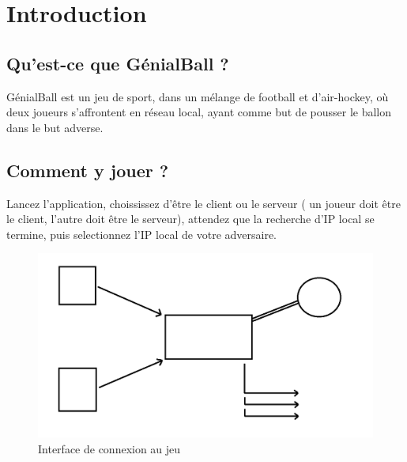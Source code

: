 \chapter{Introduction}

\section{Qu'est-ce que GénialBall ?}

GénialBall est un jeu de sport, dans un mélange de football et d’air-hockey, où deux joueurs s’affrontent en réseau local, ayant comme but de pousser le ballon dans le but adverse.\\

\section{Comment y jouer ?}

Lancez l'application, choississez d'être le client ou le serveur ( un joueur doit être le client, l'autre doit être le serveur), attendez que la recherche d'IP local se termine, puis selectionnez l'IP local de votre adversaire.
\begin{figure}[!h]
\begin{center}
\includegraphics[width=15cm]{presentation/schema}
\end{center}
\caption{Interface de connexion au jeu}
\end{figure}

\newpage

